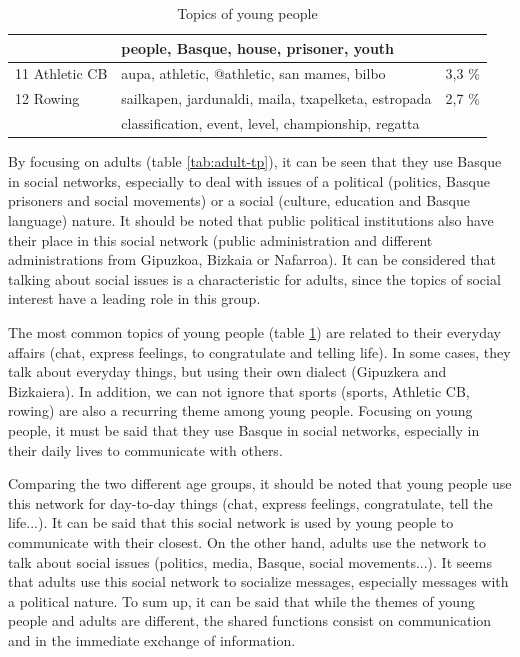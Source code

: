 \documentclass[information,article,submit,moreauthors,pdftex,10pt,a4paper]{Definitions/mdpi}
\begin{document}
\begin{table}[H]
\begin{tabular}{|l|l|l|}
                   & people, Basque, house, prisoner, youth & \\ \hline
                   11 Athletic CB & aupa, athletic, @athletic, san mames, bilbo  & 3,3 \%  \\ \hline
                   12 Rowing & sailkapen, jardunaldi, maila, txapelketa, estropada & 2,7 \%  \\ \hline
                   & classification, event, level, championship, regatta & \\ \hline
  \end{tabular}
  \caption{Topics of young people}
  \label{tab:young-tp}
\end{table}

By focusing on adults (table \ref{tab:adult-tp}), it can be seen that they use Basque in social networks, especially to deal with issues of a political (politics, Basque prisoners and social movements) or a social (culture, education and Basque language) nature. It should be noted that public political institutions also have their place in this social network (public administration and different administrations from Gipuzkoa, Bizkaia or Nafarroa). It can be considered that talking about social issues is a characteristic for adults, since the topics of social interest have a leading role in this group.

The most common topics of young people (table \ref{tab:young-tp}) are related to their everyday affairs (chat, express feelings, to congratulate and telling life). In some cases, they talk about everyday things, but using their own dialect (Gipuzkera and Bizkaiera). In addition, we can not ignore that sports (sports, Athletic CB, rowing) are also a recurring theme among young people. Focusing on young people, it must be said that they use Basque in social networks, especially in their daily lives to communicate with others.

Comparing the two different age groups, it should be noted that young people use this network for day-to-day things (chat, express feelings, congratulate, tell the life...). It can be said that this social network is used by young people to communicate with their closest. On the other hand, adults use the network to talk about social issues (politics, media, Basque, social movements...). It seems that adults use this social network to socialize messages, especially messages with a political nature. To sum up, it can be said that while the themes of young people and adults are different, the shared functions consist on communication and in the immediate exchange of information.
\end{document}
